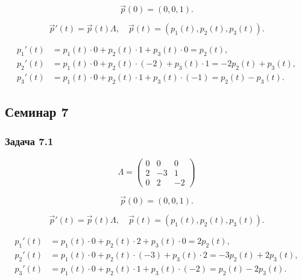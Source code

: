 \[
	\vec{p}(0) = (0,0,1).
\]

\[
	\vec{p}'(t) = \vec{p}(t)\Lambda,\quad \vec{p}(t)=(p_1(t),p_2(t),p_3(t)).
\]

\[
	\begin{aligned}
		p_1'(t) & = p_1 (t)\cdot 0 + p_2(t)\cdot 1 + p_3(t)\cdot 0 = p_2(t),            \\
		p_2'(t) & = p_1 (t)\cdot 0 + p_2(t)\cdot(-2) + p_3(t)\cdot 1 = -2p_2(t)+p_3(t), \\
		p_3'(t) & = p_1 (t)\cdot 0 + p_2(t)\cdot 1 + p_3(t)\cdot(-1) = p_2(t)-p_3(t).
	\end{aligned}
\]



\subsection{Семинар 7}

\subsubsection*{Задача 7.1}




\[
	\Lambda =
	\begin{pmatrix}
		0 & 0  & 0  \\
		2 & -3 & 1  \\
		0 & 2  & -2
	\end{pmatrix}
\]

\[
	\vec{p}(0) = (0,0,1).
\]

\[
	\vec{p}'(t) = \vec{p}(t)\Lambda,\quad \vec{p}(t)=(p_1(t),p_2(t),p_3(t)).
\]

\[
	\begin{aligned}
		p_1'(t) & = p_1 (t)\cdot 0 + p_2(t)\cdot 2 + p_3(t)\cdot 0 = 2p_2(t),            \\
		p_2'(t) & = p_1 (t)\cdot 0 + p_2(t)\cdot(-3) + p_3(t)\cdot 2 = -3p_2(t)+2p_3(t), \\
		p_3'(t) & = p_1 (t)\cdot 0 + p_2(t)\cdot 1 + p_3(t)\cdot(-2) = p_2(t)-2p_3(t).
	\end{aligned}
\]


